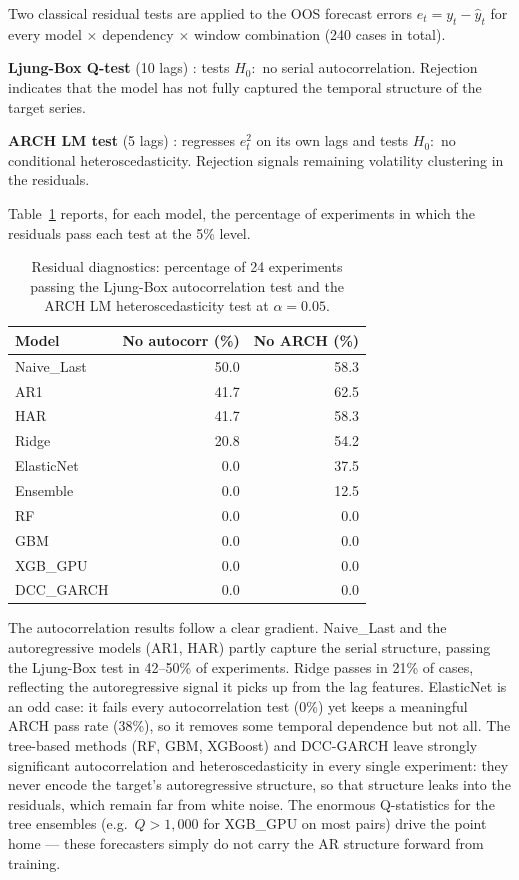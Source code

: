Two classical residual tests are applied to the OOS forecast errors
$e_t = y_t - \hat{y}_t$ for every model $\times$ dependency $\times$ window
combination (240 cases in total).

\textbf{Ljung-Box Q-test} (10 lags) \cite{ljung1978measure}: tests $H_0{:}$ no serial autocorrelation.
Rejection indicates that the model has not fully captured the temporal structure
of the target series.

\textbf{ARCH LM test} (5 lags) \cite{engle1982arch}: regresses $e_t^2$ on its own lags and tests
$H_0{:}$ no conditional heteroscedasticity.
Rejection signals remaining volatility clustering in the residuals.

Table~\ref{tab:resid_summary} reports, for each model, the percentage of
experiments in which the residuals pass each test at the 5\% level.

\begin{table}[H]
    \centering
    \caption{Residual diagnostics: percentage of 24 experiments passing the
             Ljung-Box autocorrelation test and the ARCH LM heteroscedasticity
             test at $\alpha = 0.05$.}
    \label{tab:resid_summary}
    \begin{tabular}{lrr}
        \toprule
        Model & No autocorr (\%) & No ARCH (\%) \\
        \midrule
        Naive\_Last & 50.0 & 58.3 \\
        AR1         & 41.7 & 62.5 \\
        HAR         & 41.7 & 58.3 \\
        Ridge       & 20.8 & 54.2 \\
        ElasticNet  &  0.0 & 37.5 \\
        Ensemble    &  0.0 & 12.5 \\
        RF          &  0.0 &  0.0 \\
        GBM         &  0.0 &  0.0 \\
        XGB\_GPU    &  0.0 &  0.0 \\
        DCC\_GARCH  &  0.0 &  0.0 \\
        \bottomrule
    \end{tabular}
\end{table}

The autocorrelation results follow a clear gradient. Naive\_Last and the
autoregressive models (AR1, HAR) partly capture the serial structure,
passing the Ljung-Box test in 42--50\% of experiments. Ridge passes in
21\% of cases, reflecting the autoregressive signal it picks up from the
lag features. ElasticNet is an odd case: it fails every autocorrelation
test (0\%) yet keeps a meaningful ARCH pass rate (38\%), so it removes some
temporal dependence but not all. The tree-based methods (RF, GBM, XGBoost)
and DCC-GARCH leave strongly significant autocorrelation and
heteroscedasticity in every single experiment: they never encode the
target's autoregressive structure, so that structure leaks into the
residuals, which remain far from white noise. The enormous Q-statistics for
the tree ensembles (e.g.\ $Q > 1{,}000$ for XGB\_GPU on most pairs) drive the
point home --- these forecasters simply do not carry the AR structure forward
from training.

